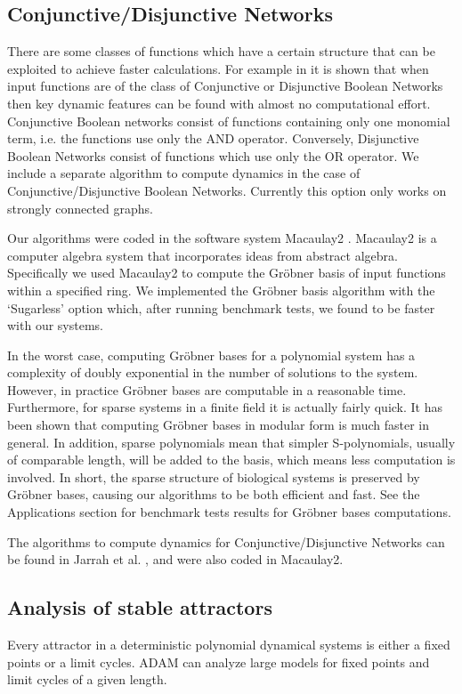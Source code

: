 \documentclass[11pt]{amsart}
\begin{document}
\subsection{Conjunctive/Disjunctive Networks}
There are some classes of functions which have a certain structure that can be
exploited to achieve faster calculations.  For example in \cite{conjunctive} it is shown that when input functions are of the class of Conjunctive or Disjunctive Boolean Networks then key dynamic features can be found with almost no computational effort.  Conjunctive Boolean networks consist of functions containing only one monomial term, i.e. the functions use only the AND operator.  Conversely, Disjunctive Boolean Networks consist of functions which use only the OR operator.  We include a separate algorithm to compute dynamics in the case of Conjunctive/Disjunctive Boolean Networks.  Currently this option only works on strongly connected graphs.


Our algorithms were coded in the software system Macaulay2 \cite{Macaulay2}.  Macaulay2 is a computer algebra system that incorporates ideas from abstract algebra.  Specifically we used Macaulay2 to compute the Gr\"obner basis of input functions within a specified ring.  We implemented the Gr\"obner basis algorithm with the `Sugarless' option which, after running benchmark tests, we found to be faster with our systems.

In the worst case, computing Gr\"obner bases for a polynomial system has a
complexity of doubly exponential in the number of solutions to the system.
However, in practice Gr\"obner bases are computable in a reasonable time.
Furthermore, for sparse systems in a finite field it is actually fairly quick.
It has been shown that computing Gr\"obner bases in modular form is much
faster in general. \cite{Brown:1971} In addition, sparse polynomials mean that
simpler S-polynomials, usually of comparable length, will be added to the
basis, which means less computation is involved.  In short, the sparse
structure of biological systems is preserved by Gr\"obner bases, causing our
algorithms to be both efficient and fast. See the Applications section for
benchmark tests results for Gr\"obner bases computations.

The algorithms to compute dynamics for Conjunctive/Disjunctive Networks can be
found in Jarrah et al. \cite{Alan:Bioinf2010}, and were also coded in Macaulay2.

\subsection{Analysis of stable attractors}
Every attractor in a deterministic polynomial dynamical systems is either a
fixed points or a limit cycles. ADAM can analyze large models for fixed points
and limit cycles of a given length.
\end{document}
